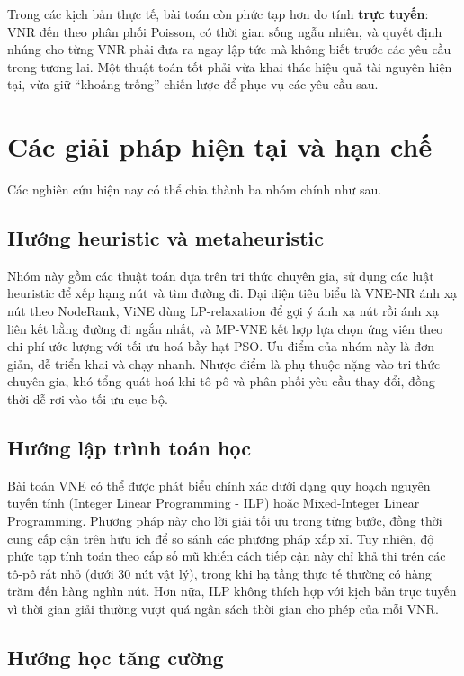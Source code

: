 \documentclass[../DoAn.tex]{subfiles}
\begin{document}
Trong các kịch bản thực tế, bài toán còn phức tạp hơn do tính \textbf{trực tuyến}: VNR đến theo phân phối Poisson, có thời gian sống ngẫu nhiên, và quyết định nhúng cho từng VNR phải đưa ra ngay lập tức mà không biết trước các yêu cầu trong tương lai. Một thuật toán tốt phải vừa khai thác hiệu quả tài nguyên hiện tại, vừa giữ ``khoảng trống'' chiến lược để phục vụ các yêu cầu sau.

\section{Các giải pháp hiện tại và hạn chế}
\label{sec:giaiphap}

Các nghiên cứu hiện nay có thể chia thành ba nhóm chính như sau.

\subsection{Hướng heuristic và metaheuristic}

Nhóm này gồm các thuật toán dựa trên tri thức chuyên gia, sử dụng các luật heuristic để xếp hạng nút và tìm đường đi. Đại diện tiêu biểu là VNE-NR\cite{cheng2011vne_nr} ánh xạ nút theo NodeRank, ViNE\cite{chowdhury2009vine} dùng LP-relaxation để gợi ý ánh xạ nút rồi ánh xạ liên kết bằng đường đi ngắn nhất, và MP-VNE\cite{mp_vne} kết hợp lựa chọn ứng viên theo chi phí ước lượng với tối ưu hoá bầy hạt PSO. Ưu điểm của nhóm này là đơn giản, dễ triển khai và chạy nhanh. Nhược điểm là phụ thuộc nặng vào tri thức chuyên gia, khó tổng quát hoá khi tô-pô và phân phối yêu cầu thay đổi, đồng thời dễ rơi vào tối ưu cục bộ.

\subsection{Hướng lập trình toán học}

Bài toán VNE có thể được phát biểu chính xác dưới dạng quy hoạch nguyên tuyến tính (Integer Linear Programming - ILP) hoặc Mixed-Integer Linear Programming. Phương pháp này cho lời giải tối ưu trong từng bước, đồng thời cung cấp cận trên hữu ích để so sánh các phương pháp xấp xỉ. Tuy nhiên, độ phức tạp tính toán theo cấp số mũ khiến cách tiếp cận này chỉ khả thi trên các tô-pô rất nhỏ (dưới 30 nút vật lý), trong khi hạ tầng thực tế thường có hàng trăm đến hàng nghìn nút. Hơn nữa, ILP không thích hợp với kịch bản trực tuyến vì thời gian giải thường vượt quá ngân sách thời gian cho phép của mỗi VNR.

\subsection{Hướng học tăng cường}
\end{document}
